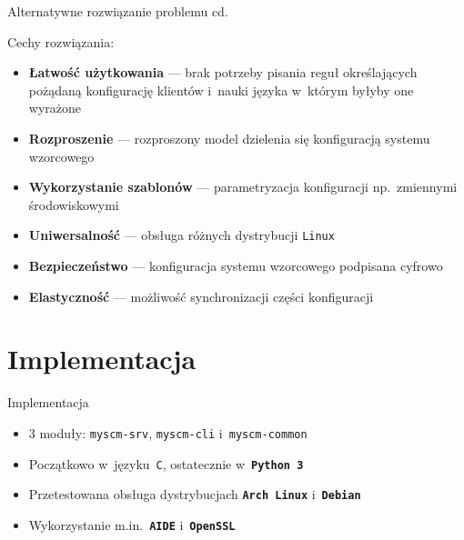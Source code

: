 \documentclass[notes,polish,xcolor=dvipsnames,hyperref={unicode,hidelinks,pdftex,pdfauthor={Patryk Bęza},pdftitle={Protokół zarządzania stacjami komputerowymi pod kontrolą systemu Linux},pdfsubject={Praca dyplomowa magisterska na Wydziale Matematyki i Nauk Informacyjnych Politechniki Warszawskiej},pdfkeywords={Software Configuration Management, SCM, Infrastructure as Code, IaC, Linux, Communications Protocol},pdfproducer={XeLaTeX},pdfcreator={latexmk}}]{beamer}
\begin{document}
\begin{frame}{Alternatywne rozwiązanie problemu cd.}

Cechy rozwiązania:
\begin{itemize}
	\item \textbf{Łatwość użytkowania} --- brak potrzeby pisania reguł określających pożądaną konfigurację klientów i~nauki języka w~którym byłyby one wyrażone
	\item \textbf{Rozproszenie} --- rozproszony model dzielenia się konfiguracją systemu wzorcowego
	\item \textbf{Wykorzystanie szablonów} --- parametryzacja konfiguracji np.~zmiennymi środowiskowymi
	\item \textbf{Uniwersalność} --- obsługa różnych dystrybucji \texttt{Linux}
	\item \textbf{Bezpieczeństwo} --- konfiguracja systemu wzorcowego podpisana cyfrowo
	\item \textbf{Elastyczność} --- możliwość synchronizacji części konfiguracji
\end{itemize}

\end{frame}


\section{Implementacja}

\begin{frame}{Implementacja}

\begin{itemize}
	\item 3 moduły: \texttt{myscm-srv}, \texttt{myscm-cli} i~\texttt{myscm-common}
	\item Początkowo w~języku~\texttt{C}, ostatecznie w~\textbf{\texttt{Python~3}}
	\item Przetestowana obsługa dystrybucjach \textbf{\texttt{Arch Linux}} i~\textbf{\texttt{Debian}}
	\item Wykorzystanie m.in.~\textbf{\texttt{AIDE}} i~\textbf{\texttt{OpenSSL}}
\end{itemize}

\end{frame}

\end{document}
